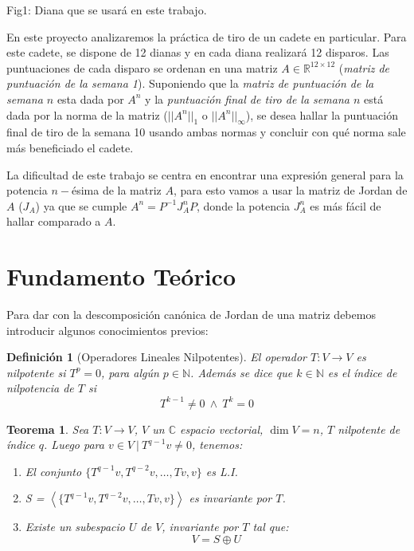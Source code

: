 \documentclass[12pt,a4paper]{article}
\newtheorem{mydef}{Definici\'on}[section]
\newtheorem{mytheo}{Teorema}[section]
\begin{document}
\begin{multicols}{2}
\begin{center}
Fig1: Diana que se usará en este trabajo.
\end{center}
\noindent En este proyecto analizaremos la práctica de tiro de un cadete en particular. Para este cadete, se dispone de 12 dianas  y en cada diana realizará 12 disparos. Las puntuaciones de cada disparo se ordenan en una matriz $A \in \mathbb{R}^{12\times 12}$ (\textit{matriz de puntuación de la semana 1}). Suponiendo que la \textit{matriz de puntuación de la semana $n$ }esta dada por $A^n$ y la \textit{puntuación final de tiro de la semana $n$ }está dada por la norma de la matriz ($||A^n||_1\text{ o }||A^n||_\infty$), se desea hallar la puntuación final de tiro de la semana 10 usando ambas normas y concluir con qué norma sale más beneficiado el cadete.

\noindent La dificultad de este trabajo se centra en encontrar una expresión general para la potencia $n-$ésima de la matriz $A$, para esto vamos a usar la matriz de Jordan de $A$ ($J_A$) ya que se cumple $A^n=P^{-1}J^n_AP$, donde la potencia  $J^n_A$ es más fácil de hallar comparado a $A$.


\section{Fundamento Teórico}

\noindent Para dar con la descomposición canónica de Jordan de una matriz debemos introducir algunos conocimientos previos:

\begin{mydef}[Operadores Lineales Nilpotentes]
	El operador $T:V\to V$ es nilpotente si $T^{p} = 0$, para algún $p\in\mathbb{N}$. Además se dice que $k\in\mathbb{N}$ es el índice de nilpotencia de $T$ si $$T^{k-1}\neq 0 \ \wedge \ T^{k} = 0$$
\end{mydef}

\begin{mytheo}\label{theo_nilpotentes}  
    \noindent Sea $T:V\to V$, $V$ un $\mathbb{C}$ espacio vectorial, $\dim V = n$, $T$ nilpotente de índice $q$. Luego para $v\in V \ | \ T^{q-1}v\neq 0$, tenemos:
	\begin{enumerate}
		\item El conjunto $\{T^{q-1}v, T^{q-2}v,\ldots,Tv, v\}$ es L.I.
		\item S = $\left<\{T^{q-1}v, T^{q-2}v,\ldots,Tv, v\}\right>$ es invariante por $T$.
		\item Existe un subespacio $U$ de $V$, invariante por $T$ tal que:
		$$V = S\oplus U$$
	\end{enumerate}
\end{mytheo}


\end{multicols}
\end{document}
